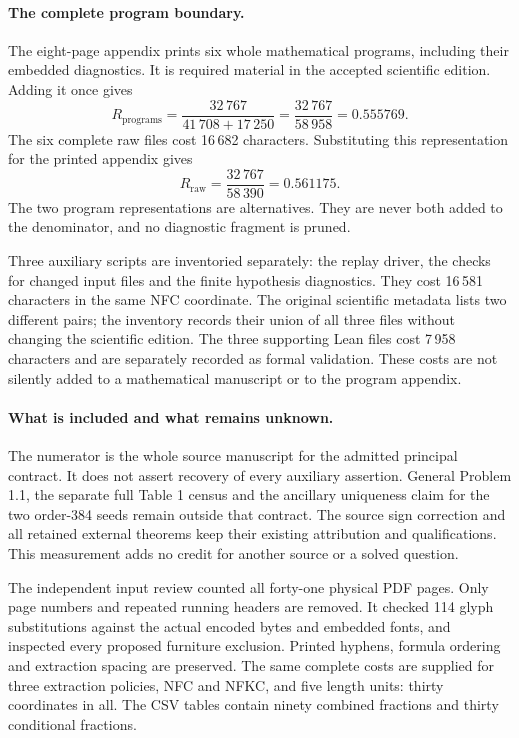 \documentclass[a4paper,11pt]{article}
\begin{document}
\paragraph{The complete program boundary.}
The eight-page appendix prints six whole mathematical programs, including
their embedded diagnostics. It is required material in the accepted
scientific edition. Adding it once gives
\[
 R_{\mathrm{programs}}=\frac{32\,767}{41\,708+17\,250}
 =\frac{32\,767}{58\,958}=0.555769.
\]
The six complete raw files cost 16\,682 characters. Substituting this
representation for the printed appendix gives
\[
 R_{\mathrm{raw}}=\frac{32\,767}{58\,390}=0.561175.
\]
The two program representations are alternatives. They are never both
added to the denominator, and no diagnostic fragment is pruned.

Three auxiliary scripts are inventoried separately: the replay driver,
the checks for changed input files and the finite hypothesis diagnostics.
They cost 16\,581 characters in the same NFC coordinate. The original
scientific metadata lists two different pairs; the inventory records
their union of all three files without changing the scientific edition.
The three supporting Lean files cost 7\,958 characters and are separately
recorded as formal validation. These costs are not silently added to a
mathematical manuscript or to the program appendix.

\paragraph{What is included and what remains unknown.}
The numerator is the whole source manuscript for the admitted principal
contract. It does not assert recovery of every auxiliary assertion.
General Problem 1.1, the separate full Table 1 census and the ancillary
uniqueness claim for the two order-384 seeds remain outside that contract.
The source sign correction and all retained external theorems keep their
existing attribution and qualifications. This measurement adds no credit for another source or a solved question.

The independent input review counted all forty-one physical PDF pages.
Only page numbers and repeated running headers are removed. It checked
114 glyph substitutions against the actual encoded bytes and embedded
fonts, and inspected every proposed furniture exclusion. Printed hyphens,
formula ordering and extraction spacing are preserved. The same complete
costs are supplied for three extraction policies, NFC and NFKC, and five
length units: thirty coordinates in all. The CSV tables contain ninety
combined fractions and thirty conditional fractions.
\end{document}
